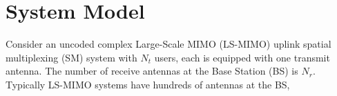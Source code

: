 \documentclass[12pt, draftclsnofoot, onecolumn]{IEEEtran}
\begin{document}
%
\IEEEpeerreviewmaketitle



\section{System Model}
% 
% 
% 
% 

 
Consider an uncoded complex Large-Scale MIMO (LS-MIMO) uplink spatial multiplexing (SM) system with $N_{t}$ users, each is equipped with one transmit antenna. The number of receive antennas at the Base Station (BS) is $N_{r}$. Typically LS-MIMO systems have hundreds of antennas at the BS, 
    
\end{document}
